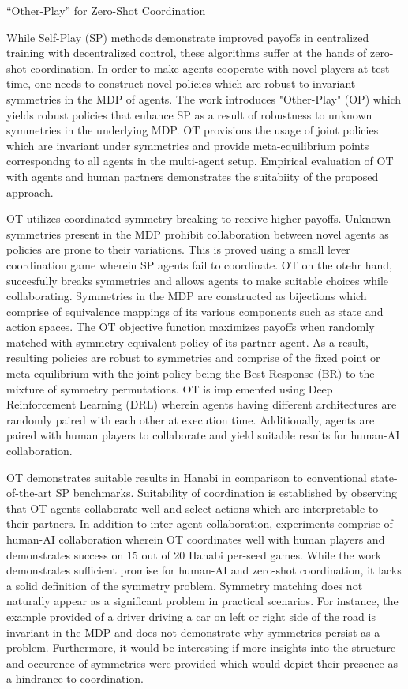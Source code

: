 \documentclass[11pt,letterpaper]{article}
\begin{document}
\begin{center}
  \large{“Other-Play” for Zero-Shot Coordination}
\end{center}

While Self-Play (SP) methods demonstrate improved payoffs in centralized training with decentralized control, these algorithms suffer at the hands of zero-shot coordination. In order to make agents cooperate with novel players at test time, one needs to construct novel policies which are robust to invariant symmetries in the MDP of agents. The work introduces "Other-Play" (OP) which yields robust policies that enhance SP as a result of robustness to unknown symmetries in the underlying MDP. OT provisions the usage of joint policies which are invariant under symmetries and provide meta-equilibrium points correspondng to all agents in the multi-agent setup. Empirical evaluation of OT with agents and human partners demonstrates the suitabiity of the proposed approach. 

OT utilizes coordinated symmetry breaking to receive higher payoffs. Unknown symmetries present in the MDP prohibit collaboration between novel agents as policies are prone to their variations. This is proved using a small lever coordination game wherein SP agents fail to coordinate. OT on the otehr hand, succesfully breaks symmetries and allows agents to make suitable choices while collaborating. Symmetries in the MDP are constructed as bijections which comprise of equivalence mappings of its various components such as state and action spaces. The OT objective function maximizes payoffs when randomly matched with  symmetry-equivalent policy of its partner agent. As a result, resulting policies are robust to symmetries and comprise of the fixed point or meta-equilibrium with the joint policy being the Best Response (BR) to the mixture of symmetry permutations. OT is implemented using Deep Reinforcement Learning (DRL) wherein agents having different architectures are randomly paired with each other at execution time. Additionally, agents are paired with human players to collaborate and yield suitable results for human-AI collaboration. 

OT demonstrates suitable results in Hanabi in comparison to conventional state-of-the-art SP benchmarks. Suitability of coordination is established by observing that OT agents collaborate well and select actions which are interpretable to their partners. In addition to inter-agent collaboration, experiments comprise of human-AI collaboration wherein OT coordinates well with human players and demonstrates success on 15 out of 20 Hanabi per-seed games. While the work demonstrates sufficient promise for human-AI and zero-shot coordination, it lacks a solid definition of the symmetry problem. Symmetry matching does not naturally appear as a significant problem in practical scenarios. For instance, the example provided of a driver driving a car on left or right side of the road is invariant in the MDP and does not demonstrate why symmetries persist as a problem. Furthermore, it would be interesting if more insights into the structure and occurence of symmetries were provided which would depict their presence as a hindrance to coordination. 
\end{document}
